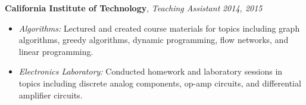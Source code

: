 \documentclass{article}
\newenvironment{changemargin}[2]{%
  \begin{list}{}{%
    \setlength{\topsep}{0pt}%
    \setlength{\leftmargin}{#1}%
    \setlength{\rightmargin}{#2}%
    \setlength{\listparindent}{\parindent}%
    \setlength{\itemindent}{\parindent}%
    \setlength{\parsep}{\parskip}%
  }%
  \item[]}{\end{list}
}
\newenvironment{body} {
	\vspace*{-16pt}
	\begin{changemargin}{-0.25in}{-0.5in}
  }	
	{\end{changemargin}
}
\begin{document}
\begin{body}
	\smallskip

	\textbf{California Institute of Technology}, \emph{Teaching Assistant} \hfill \emph{2014, 2015} \\
	\vspace*{-4pt}
	\begin{itemize}
		\item \emph{Algorithms:} Lectured and created course materials for topics including graph algorithms, greedy algorithms, dynamic programming, flow networks, and linear programming.
		\item \emph{Electronics Laboratory:} Conducted homework and laboratory sessions in topics including discrete analog components, op-amp circuits, and differential amplifier circuits.
	\end{itemize}
\end{body}

\smallskip
\end{document}
